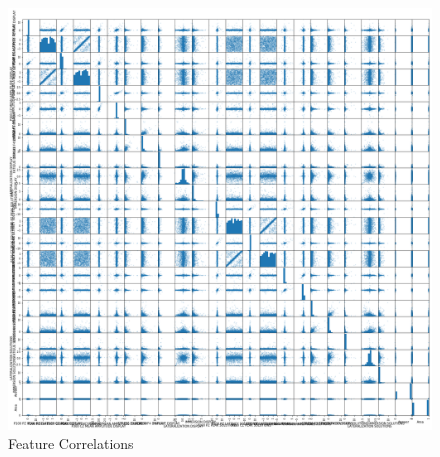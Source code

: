 \documentclass[conference]{IEEEtran}
\begin{document}
\clearpage
\appendix
\begin{figure}[h]
    \centering
    \includegraphics[width=2\linewidth]{featurecorrelation.png}
    \caption{Feature Correlations}
    \label{fig:feature}
\end{figure}
\end{document}
